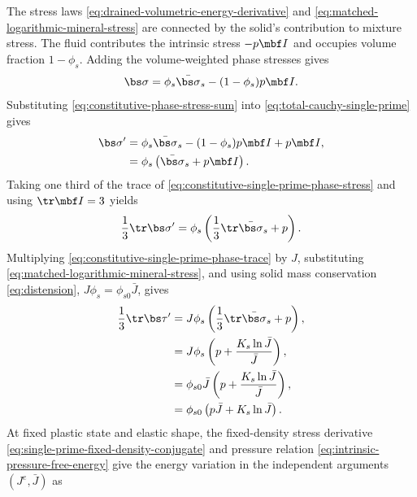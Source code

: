 The stress laws \eqref{eq:drained-volumetric-energy-derivative} and
\eqref{eq:matched-logarithmic-mineral-stress} are connected by the solid's contribution to mixture
stress.  The fluid contributes the intrinsic stress \(-p\mbf I\) and occupies
volume fraction \(1-\phi_s\).  Adding the volume-weighted phase stresses
gives
\begin{equation}
 \bs\sigma=\phi_s\bar{\bs\sigma}_s-(1-\phi_s)p\mbf I.
 \label{eq:constitutive-phase-stress-sum}
\end{equation}
Substituting \eqref{eq:constitutive-phase-stress-sum} into
\eqref{eq:total-cauchy-single-prime} gives
\begin{align}
 \bs\sigma^{\prime}
 &=\phi_s\bar{\bs\sigma}_s-(1-\phi_s)p\mbf I+p\mbf I,
 \notag
\\
 &=\phi_s\left(\bar{\bs\sigma}_s+p\mbf I\right).
 \label{eq:constitutive-single-prime-phase-stress}
\end{align}
Taking one third of the trace of
\eqref{eq:constitutive-single-prime-phase-stress} and using \(\tr\mbf I=3\) yields
\begin{equation}
 \frac13\tr\bs\sigma^{\prime}
 =\phi_s\left(\frac13\tr\bar{\bs\sigma}_s+p\right).
 \label{eq:constitutive-single-prime-phase-trace}
\end{equation}
Multiplying \eqref{eq:constitutive-single-prime-phase-trace} by \(J\), substituting
\eqref{eq:matched-logarithmic-mineral-stress}, and using solid mass
conservation \eqref{eq:distension}, \(J\phi_s=\phi_{s0}\bar J\), gives
\begin{align}
 \frac13\tr\bs\tau^{\prime}
 &=J\phi_s\left(\frac13\tr\bar{\bs\sigma}_s+p\right),
 \notag
\\
 &=J\phi_s\left(p+\frac{K_s\ln\bar J}{\bar J}\right),
 \notag
\\
 &=\phi_{s0}\bar J
 \left(p+\frac{K_s\ln\bar J}{\bar J}\right),
 \notag
\\
 &=\phi_{s0}\left(p\bar J+K_s\ln\bar J\right).
 \label{eq:constitutive-single-prime-mineral-trace}
\end{align}
At fixed plastic state and elastic shape, the fixed-density stress derivative
\eqref{eq:single-prime-fixed-density-conjugate} and pressure relation
\eqref{eq:intrinsic-pressure-free-energy} give the energy variation in the
independent arguments \((J^e,\bar J)\) as
